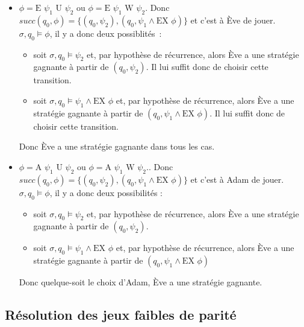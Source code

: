 \documentclass[10pt,a4paper]{article}
\begin{document}
\begin{itemize}
\item $\phi = \mbox{E } \psi_1 \mbox{ U } \psi_2$ ou $\phi = \mbox{E } \psi_1 \mbox{ W } \psi_2$. Donc $succ(q_0,\phi) = \{ (q_0,\psi_2), (q_0,\psi_1 \land \mbox{EX }  \phi) \}$ et c'est à Ève de jouer. $\sigma,q_0 \vDash \phi$, il y a donc deux possiblités :
\begin{itemize}
	\item soit $\sigma,q_0 \vDash \psi_2$ et, par hypothèse de récurrence, alors Ève a une stratégie gagnante à partir de $(q_0,\psi_2)$. Il lui suffit donc de choisir cette transition.
	\item soit $ \sigma, q_0 \vDash \psi_1 \land \mbox{EX }  \phi$ et, par hypothèse de récurrence, alors Ève a une stratégie gagnante à partir de $(q_0,\psi_1 \land \mbox{EX }  \phi)$. Il lui suffit donc de choisir cette transition.
\end{itemize}
Donc Ève a une stratégie gagnante dans tous les cas.

\item $\phi = \mbox{A } \psi_1 \mbox{ U } \psi_2$ ou $\phi = \mbox{A } \psi_1 \mbox{ W } \psi_2$.. Donc $succ(q_0,\phi) = \{ (q_0,\psi_2), (q_0,\psi_1 \land \mbox{EX }  \phi) \}$ et c'est à Adam de jouer. $\sigma,q_0 \vDash \phi$, il y a donc deux possibilités :
\begin{itemize}
	\item soit $\sigma,q_0 \vDash \psi_2$ et, par hypothèse de récurrence, alors Ève a une stratégie gagnante à partir de $(q_0,\psi_2)$.
	\item soit $ \sigma, q_0 \vDash \psi_1 \land \mbox{EX }  \phi$ et, par hypothèse de récurrence, alors Ève a une stratégie gagnante à partir de $(q_0,\psi_1 \land \mbox{EX }  \phi)$
\end{itemize}
Donc quelque-soit le choix d'Adam, Ève a une stratégie gagnante.
\end{itemize}

\subsection{Résolution des jeux faibles de parité}
\end{document}
